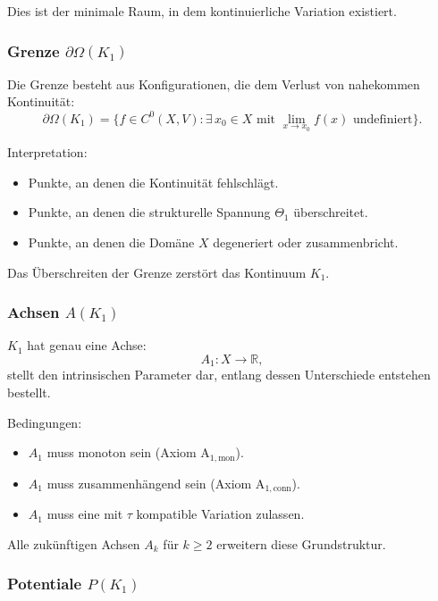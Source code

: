 Dies ist der minimale Raum, in dem kontinuierliche Variation existiert.

\subsubsection{Grenze \texorpdfstring{$\partial\Omega(K_1)$}{\partial\Omega(K_1)}}

Die Grenze besteht aus Konfigurationen, die dem Verlust von nahekommen
Kontinuität:
\[
\partial\Omega(K_1) =
\{ f \in C^0(X,V) : \exists\, x_0 \in X \text{ mit }
\lim_{x \to x_0} f(x) \text{ undefiniert} \}.
\]

Interpretation:
\begin{itemize}
    \item Punkte, an denen die Kontinuität fehlschlägt.
    \item Punkte, an denen die strukturelle Spannung $\Theta_1$ überschreitet.
    \item Punkte, an denen die Domäne $X$ degeneriert oder zusammenbricht.
\end{itemize}

Das Überschreiten der Grenze zerstört das Kontinuum $K_1$.

\subsubsection{Achsen \texorpdfstring{$A(K_1)$}{A(K_1)}}

$K_1$ hat genau eine Achse:
\[
A_1 : X \to \mathbb{R},
\]
stellt den intrinsischen Parameter dar, entlang dessen Unterschiede entstehen
bestellt.

Bedingungen:
\begin{itemize}
    \item $A_1$ muss monoton sein (Axiom A$_{1,\text{mon}}$).
    \item $A_1$ muss zusammenhängend sein (Axiom A$_{1,\text{conn}}$).
    \item $A_1$ muss eine mit $\tau$ kompatible Variation zulassen.
\end{itemize}

Alle zukünftigen Achsen $A_k$ für $k \ge 2$ erweitern diese Grundstruktur.

\subsubsection{Potentiale \texorpdfstring{$P(K_1)$}{P(K_1)}}

